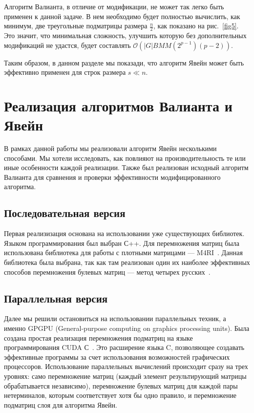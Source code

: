 Алгоритм Валианта, в отличие от модификации, не может так легко быть применен к данной задаче. В нем необходимо будет полностью вычислить, как минимум, две треугольные подматрицы размера $\frac{n}{2}$, как показано на рис.~\ref{fig5}.
Это значит, что минимальная сложность, улучшить которую без дополнительных модификаций не удастся, будет составлять $\mathcal{O}(|G|BMM(2^{p - 1})(p - 2))$.

Таким образом, в данном разделе мы показади, что алгоритм Явейн может быть эффективно применен для строк размера $s \ll n$.



\section{Реализация алгоритмов Валианта и Явейн}

В рамках данной работы мы реализовали алгоритм Явейн несколькими способами. Мы хотели исследовать, как повлияют на производительность те или иные особенности каждой реализации. Также был реализован исходный алгоритм Валианта для сравнения и проверки эффективности модифицированного алгоритма.

\subsection{Последовательная версия}

Первая реализизация основана на использовании уже существующих библиотек.
Языком программирования был выбран С++. Для перемножения матриц была использована библиотека для работы с плотными матрицами --- M4RI~\cite{M4RI}.
Данная библиотека была выбрана, так как там реализован один их наиболее эффективных способов перемножения булевых матриц --- метод четырех русских~\cite{albrechtefficient, arlazarov1970economical}.

\subsection{Параллельная версия}

Далее мы решили остановиться на использовании параллельных техник, а именно GPGPU (General-purpose computing on graphics processing units). Была создана простая реализация перемножения подматриц на языке программирования CUDA С~\cite{nvidia2011nvidia}. Это расширение языка C, позволяющее создавать эффективные программы за счет использования возможностей графических процессоров.  Использование параллельных вычислений происходит сразу на трех уровнях: само перемножение матриц (каждый элемент результирующий матрицы обрабатывается независимо), перемножение булевых матриц для каждой пары нетерминалов, которым соответствует хотя бы одно правило, и перемножение подматриц слоя для алгоритма Явейн.


